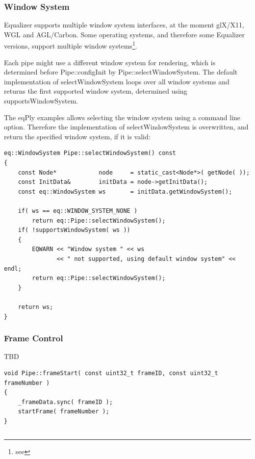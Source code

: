 \documentclass[10pt,a4]{scrartcl}
\begin{document}
\subsubsection{Window System}

Equalizer supports multiple window system interfaces, at the moment
glX/X11, WGL and AGL/Carbon. Some operating systems, and therefore some
Equalizer versions, support multiple window systems\footnote{see
  }.

Each pipe might use a different window system for rendering, which is
determined before \textsf{Pipe::configInit} by
\textsf{Pipe::selectWindowSystem}. The default implementation of
\textsf{selectWindowSystem} loops over all window systems and returns
the first supported window system, determined using
\textsf{supportsWindowSystem}.

The \textsf{eqPly} examples allows selecting the window system using a
command line option. Therefore the implementation of
\textsf{selectWindowSystem} is overwritten, and return the specified
window system, if it is valid:

{\footnotesize\begin{lstlisting}
eq::WindowSystem Pipe::selectWindowSystem() const
{
    const Node*            node     = static_cast<Node*>( getNode( ));
    const InitData&        initData = node->getInitData();
    const eq::WindowSystem ws       = initData.getWindowSystem();

    if( ws == eq::WINDOW_SYSTEM_NONE )
        return eq::Pipe::selectWindowSystem();
    if( !supportsWindowSystem( ws ))
    {
        EQWARN << "Window system " << ws 
               << " not supported, using default window system" << endl;
        return eq::Pipe::selectWindowSystem();
    }

    return ws;
}
\end{lstlisting}}%

\subsubsection{Frame Control}

TBD

{\footnotesize\begin{lstlisting}
void Pipe::frameStart( const uint32_t frameID, const uint32_t frameNumber )
{
    _frameData.sync( frameID );
    startFrame( frameNumber );
}
\end{lstlisting}}

{\footnotesize\begin{lstlisting}
\end{lstlisting}}
\fi
\end{document}
